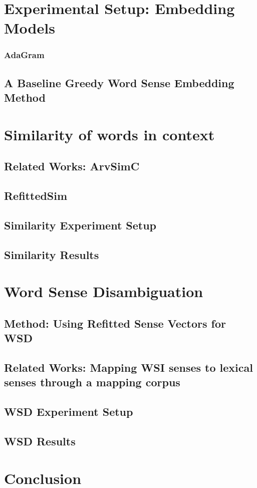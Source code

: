 \documentclass{sig-alternate}
\begin{document}
	\section{Experimental Setup: Embedding Models} \label{method}
		\subsubsection{AdaGram}
		\subsection{A Baseline Greedy Word Sense Embedding Method}

	\section{Similarity of words in context}
		\subsection{Related Works: ArvSimC}
		\subsection{RefittedSim}\label{RefittedSimVsAvgSimC}
		
		\subsection{Similarity Experiment Setup}
		\subsection{Similarity Results}

	\section{Word Sense Disambiguation} \label{lexicalWSD}
		\subsection{Method: Using Refitted Sense Vectors for WSD}	
		\subsection{Related Works: Mapping WSI senses to lexical senses through a mapping corpus}
		\subsection{WSD Experiment Setup}
		\subsection{WSD Results}

	\section{Conclusion}\label{conclusion}
	
	
\end{document}
